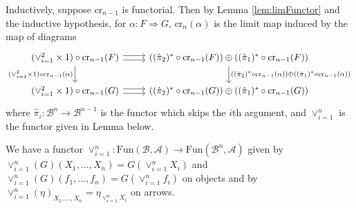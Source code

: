 Inductively, suppose $\text{cr}_{n-1}$ is functorial. Then by Lemma \ref{lem:limFunctor} and the inductive hypothesis, for $\alpha:F\Rightarrow G$, $\text{cr}_n(\alpha)$ is the limit map induced by the map of diagrams
\[\begin{tikzcd}
	{(\lor_{i=1}^2\times 1)\circ \text{cr}_{n-1}(F)} & {((\hat{\pi}_2)^*\circ \text{cr}_{n-1}(F))\oplus((\hat{\pi}_1)^*\circ \text{cr}_{n-1}(F))} \\
	{(\lor_{i=1}^2\times 1)\circ \text{cr}_{n-1}(G)} & {((\hat{\pi}_2)^*\circ \text{cr}_{n-1}(G))\oplus((\hat{\pi}_1)^*\circ \text{cr}_{n-1}(G))}
	\arrow[shift left, from=1-1, to=1-2]
	\arrow[shift right, from=1-1, to=1-2]
	\arrow["{(\lor_{i=1}^2\times 1)\circ\text{cr}_{n-1}(\alpha)}"', from=1-1, to=2-1]
	\arrow[shift left, from=2-1, to=2-2]
	\arrow[shift right, from=2-1, to=2-2]
	\arrow["{((\hat{\pi}_2)^*\circ \text{cr}_{n-1}(\alpha))\oplus((\hat{\pi}_1)^*\circ \text{cr}_{n-1}(\alpha))}", from=1-2, to=2-2]
\end{tikzcd}\]
where $\hat{\pi}_i:\mathcal{B}^n\rightarrow \mathcal{B}^{n-1}$ is the functor which skips the $i$th argument, and $\lor_{i=1}^n$ is the functor given in Lemma \label{lem:lorFunc} below.
\begin{lem}[label=lem:lorFunc]
    We have a functor $\lor_{i=1}^n:\text{Fun}(\mathcal{B},\mathcal{A})\rightarrow \text{Fun}(\mathcal{B}^n,\mathcal{A})$ given by $\lor_{i=1}^n(G)(X_1,...,X_n) = G(\lor_{i=1}^nX_i)$ and $\lor_{i=1}^n(G)(f_1,...,f_n) = G(\lor_{i=1}^nf_i)$ on objects and by $\lor_{i=1}^n(\eta)_{X_1,...,X_n} = \eta_{\lor_{i=1}^nX_i}$ on arrows.
\end{lem}
